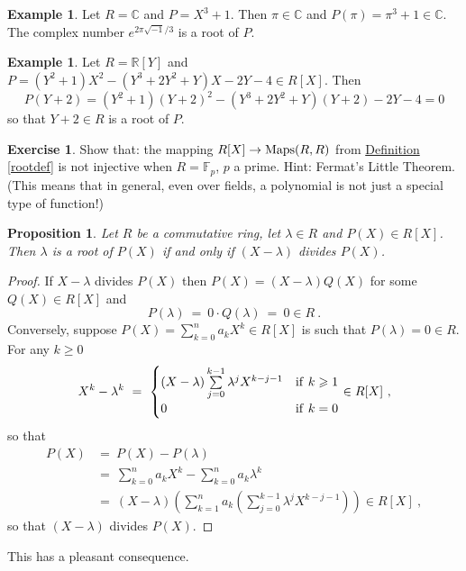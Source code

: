 \documentclass[11pt]{amsbook}
\newtheorem{proposition}[theorem]{Proposition}
\theoremstyle{definition}
\newtheorem{ex}[theorem]{Example}
\newtheorem{exercise}{Exercise}
\begin{document}
\begin{ex} Let $ R = \mathbb{C}$ and $P  = X^3 + 1$. Then $\pi \in \mathbb{C}$ and $P(\pi) = \pi^3 +1 \in \mathbb{C}$. The complex number $e^{2\pi \sqrt{-1}/3}$ is a root of $P$.
\end{ex}

\begin{ex}
Let $R = \mathbb{R}[Y]$ and $P = (Y^2 +1)X^2 - (Y^3+2Y^2+Y)X - 2Y -4\in R[X]$. Then $$P(Y+2) = (Y^2+1)(Y+2)^2 - (Y^3+2Y^2 + Y)(Y+2)  - 2Y - 4 = 0$$ so that $Y+2\in R$ is a root of $P$.
\end{ex}

\begin{exercise}
Show that: the mapping $R[X] \to {\rm Maps}(R,R)$ from \hyperref[rootdef]{Definition \ref{rootdef}} is not injective when $R = \mathbb{F}_p$, $p$ a prime. Hint: Fermat's Little Theorem. (This means that in general, even over fields, a polynomial is not just a special type of function!)\end{exercise}

\begin{proposition}\label{divlinfact}
Let $R$ be a commutative ring, let $\lambda\in R$ and $P(X)\in R[X]$. Then $\lambda$ is a root of $P(X)$
if and only if $(X-\lambda)$ divides $P(X)$.
\end{proposition}

\begin{proof} If $X-\lambda$ divides $P(X)$ then $P(X)=(X-\lambda)Q(X)$ for some $Q(X) \in R[X]$ and 
$$P(\lambda)~=~0 \cdot Q(\lambda)~=~0  \in R~.$$
Conversely, suppose $P(X)=\sum\limits^n_{k=0}a_kX^k \in R[X]$ is such that $P(\lambda)=0 \in R$. For any $k \geqslant 0$
$$X^k-\lambda^k~=~\begin{cases}
(X-\lambda)\sum\limits^{k-1}_{j=0}\lambda^jX^{k-j-1}&{\rm if}~k \geqslant 1\\
0&{\rm if}~k=0
\end{cases}\in R[X]~,$$
so that 
$$\begin{array}{ll}
P(X)&=~P(X)-P(\lambda)\\[1ex]
&=~\sum\limits^n_{k=0}a_kX^k-\sum\limits^n_{k=0}a_k\lambda^k\\[1ex]
&=~(X-\lambda)(\sum\limits^n _{k=1}a_k(\sum\limits^{k-1}_{j=0}\lambda^jX^{k-j-1})) \in R[X]~,
\end{array}$$
so that $(X-\lambda)$ divides $P(X)$.
\end{proof}

This has a pleasant consequence.
\end{document}
